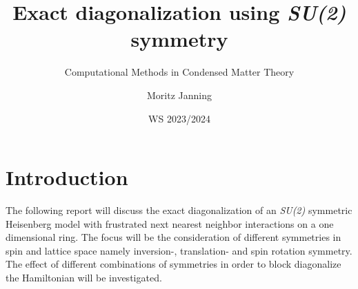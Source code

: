 \documentclass{scrartcl}
\title{Exact diagonalization using \textit{SU(2)} symmetry}
\subtitle{Computational Methods in Condensed Matter Theory}
\author{Moritz Janning}
\date{WS 2023/2024}
\begin{document}
\maketitle

\section{Introduction}
The following report will discuss the exact diagonalization of an \textit{SU(2)} symmetric Heisenberg model with frustrated next nearest neighbor interactions on a one dimensional ring. The focus will be the consideration of different symmetries in spin and lattice space namely inversion-, translation- and spin rotation symmetry. The effect of different combinations of symmetries in order to block diagonalize the Hamiltonian will be investigated.
\end{document}
